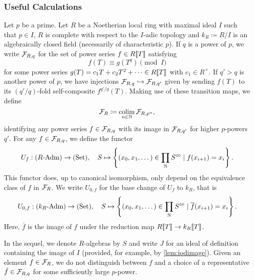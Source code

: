 \subsubsection{Useful Calculations} %
\label{ssub:Useful Calculations}
Let $p$ be a prime.
Let $R$ be a Noetherian local ring with maximal ideal $I$ such that 
$p \in I$, $R$ is complete with respect to the $I$-adic topology and $k_R
\coloneqq R/I$ is an algebraically closed field (necessarily of characteristic
$p$). 
If $q$ is a power of $p$, we write $\mathcal{F}_{R,q}$ for the set of power series $f
\in R\llbracket T \rrbracket$ satisfying 
\begin{equation} \label{eq:condonpowerseries}
  f(T) \equiv g(T^q) \pmod I
\end{equation}
for some power series $g(T) = c_1 T + c_2 T^2 + \dots \in R\llbracket T \rrbracket$ with 
$c_1 \in R^\times$. 
If $q'>q$ is another power of $p$, we have injections $\mathcal{F}_{R,q} \hookrightarrow \mathcal{F}_{R,q'}$
given by sending $f(T)$ to its $(q'/q)$-fold self-composite $f^{q'/q}(T)$. 
Making use of these transition maps, we define
\begin{equation*}
  \mathcal{F}_R \coloneqq \operatorname*{colim}_{n \in \mathbb{N}} \mathcal{F}_{R, p^n},
\end{equation*}
identifying any power series $f \in \mathcal{F}_{R,q}$ with its image in $\mathcal{F}_{R,q'}$ for 
higher $p$-powers $q'$. 
For any $f \in \mathcal{F}_{R,q}$, we define the functor
\begin{equation*}
  U_f: {({R}\text-\mathrm{Adm})} \to {(\mathrm{Set})}, \quad S \mapsto \left\{(x_0,x_1, \dots) \in \prod_{\mathbb{N}} S^{\circ \hspace{-0.5pt} \circ} 
                                          \mid f(x_{i+1}) = x_i\right\}.
\end{equation*}
This functor does, up to canonical isomorphism, only depend on the equivalence
class of $f$ in $\mathcal{F}_{R}$. 
We write $U_{0,f}$ for the base change of $U_f$ to $k_R$, that is
\begin{equation*}
  U_{0,f}: {({k_R}\text-\mathrm{Adm})} \to {(\mathrm{Set})}, \quad S \mapsto \left\{(x_0,x_1, \dots) \in
                              \prod_{\mathbb{N}} S^{\circ \hspace{-0.5pt} \circ} \mid \overline f(x_{i+1}) = x_i\right\}.
\end{equation*}
Here, $\bar f$ is the image of $f$ under the reduction map $R\llbracket T \rrbracket \to
k_R\llbracket T \rrbracket$. 

In the sequel, we denote $R$-algebras by $S$ and write $J$ for an ideal
of definition containing the image of $I$ (provided, for example, by \ref{lem:iodimage}). 
Given an element $f\in \mathcal{F}_R$, we do not distinguish between $f$ and a choice of a 
representative $\tilde f \in \mathcal{F}_{R,q}$ for some sufficiently large $p$-power.

